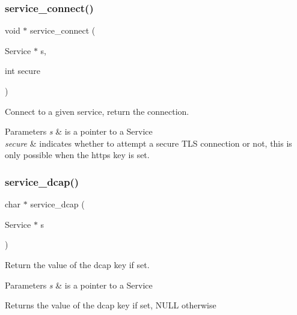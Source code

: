 \subsubsection{\texorpdfstring{service\+\_\+connect()}{service\_connect()}}
{\footnotesize\ttfamily void $\ast$ service\+\_\+connect (\begin{DoxyParamCaption}\item[{Service $\ast$}]{s,  }\item[{int}]{secure }\end{DoxyParamCaption})}



Connect to a given service, return the connection. 


\begin{DoxyParams}{Parameters}
{\em s} & is a pointer to a Service \\
\hline
{\em secure} & indicates whether to attempt a secure T\+LS connection or not, this is only possible when the \textquotesingle{}https\textquotesingle{} key is set. \\
\hline
\end{DoxyParams}
\mbox{\label{group__se__discover_ga761f59dc096114f53a72b58bfe77d281}} 
\subsubsection{\texorpdfstring{service\+\_\+dcap()}{service\_dcap()}}
{\footnotesize\ttfamily char $\ast$ service\+\_\+dcap (\begin{DoxyParamCaption}\item[{Service $\ast$}]{s }\end{DoxyParamCaption})}



Return the value of the \textquotesingle{}dcap\textquotesingle{} key if set. 


\begin{DoxyParams}{Parameters}
{\em s} & is a pointer to a Service \\
\hline
\end{DoxyParams}
\begin{DoxyReturn}{Returns}
the value of the \textquotesingle{}dcap\textquotesingle{} key if set, N\+U\+LL otherwise 
\end{DoxyReturn}
\mbox{\label{group__se__discover_ga773e278c046c45a0d411bbb49cf2adea}} 
